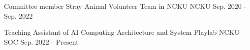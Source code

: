

\begin{cventries}
  \cventry
  {Committee member}
  {Stray Animal Volunteer Team in NCKU}
  {NCKU}
  {Sep. 2020 - Sep. 2022}
  {}

  \cventry
  {Teaching Assistant of AI Computing Architecture and System} %
  {Playlab} %
  {NCKU SOC} %
  {Sep. 2022 - Present} %
  {}
\end{cventries}
